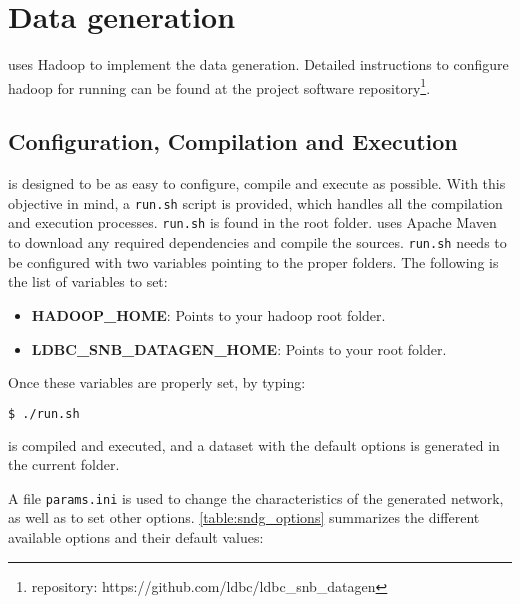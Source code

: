 \section{Data generation}
\label{section:data_generation}

\datagen uses Hadoop to implement the data generation. Detailed instructions
to configure hadoop for running \datagen can be found at the \datagen project
software repository\footnote{ \datagen repository:
https://github.com/ldbc/ldbc\_snb\_datagen}. 

\subsection{\datagen Configuration, Compilation and Execution}

\datagen is designed to be as easy to configure, compile and execute as
possible. With this objective in mind, a \texttt{run.sh} script is provided,
which handles all the compilation and execution processes.  \texttt{run.sh}
is found in the \datagen root folder. \datagen uses Apache Maven to download any
required dependencies and compile the sources.  \texttt{run.sh} needs to be
configured with two variables pointing to the proper folders. The following is
the list of variables to set:

\begin{itemize}
    \item \textbf{HADOOP\_HOME}: Points to your hadoop root folder.
    \item \textbf{LDBC\_SNB\_DATAGEN\_HOME}: Points to your \datagen root folder.
\end{itemize}

Once these variables are properly set, by typing:

\begin{lstlisting}[backgroundcolor=\color{gray}, frame=single, language=bash]
$ ./run.sh
\end{lstlisting}

\datagen is compiled and executed, and a dataset with the default options is
generated in the current folder.

A file \texttt{params.ini} is used to change the characteristics of the
generated network, as well as to set other options. \autoref{table:sndg_options}
summarizes the different available options and their default values:

